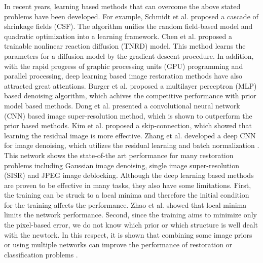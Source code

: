 \documentclass[journal]{IEEEtran}
\begin{document}
In recent years, learning based methods that can overcome 
the above stated problems have been developed. For example,
Schmidt et al. \cite{schmidt2014shrinkage} proposed a cascade of shrinkage 
fields (CSF). The algorithm unifies the random field-based model and quadratic 
optimization into a learning framework.  Chen et al. \cite{chen2016trainable} 
proposed a trainable nonlinear reaction diffusion (TNRD) model. 
This method learns the parameters for a diffusion model by the gradient descent 
procedure. In addition, with the rapid progress of graphic processing units 
(GPU) programming and parallel processing, deep learning based 
image restoration methods have also attracted great attentions. 
Burger et al. \cite{burger2012image} proposed a multilayer perceptron 
(MLP) based denoising algorithm, which achives the competitive performance 
with prior model based methods. Dong et al. \cite{dong2016image} presented a convolutional 
neural network (CNN) based image super-resolution method, which
is shown to outperform the prior based methods. Kim et al. \cite{kim20162} 
proposed a skip-connection, which showed that learning the
residual image is more effective. Zhang et al. \cite{zhang2016beyond} 
developed a deep CNN for image denoising, which utilizes the residual 
learning and batch normalization \cite{ioffe2015batch}. 
This network shows the state-of-the art performance 
for many restoration problems including Gaussian image denoising, 
single image super-resolution (SISR) and JPEG image deblocking. 
Although the deep learning based methods are proven to be effective 
in many tasks, they also have some limitations. First, the training can be 
struck to a local minima and therefore the initial condition for the training 
affects the performance. Zhao et al.\cite{zhao2016loss} showed that local 
minima limits the network performance. Second, since the training aims to 
minimize only the pixel-based error, we do not know which prior or which
structure is well dealt with the newtork. In this respect,  it is shown that
combining some image priors \cite{burger2013learning} or
using multiple networks can improve the performance of 
restoration or classification problems \cite{ciresan2011convolutional}.
 
\end{document}
